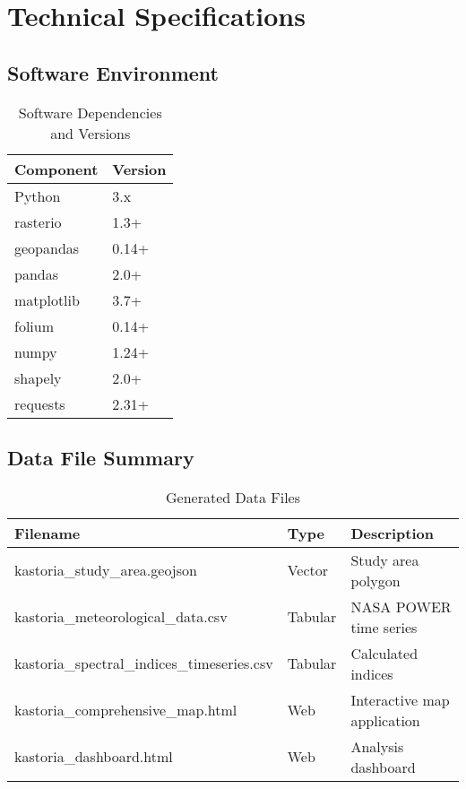 \documentclass[a4paper,12pt]{article}
\begin{document}
\newpage
\appendix

\section{Technical Specifications}

\subsection{Software Environment}

\begin{table}[H]
    \centering
    \caption{Software Dependencies and Versions}
    \begin{tabular}{@{}ll@{}}
        \toprule
        Component  & Version \\
        \midrule
        Python     & 3.x     \\
        rasterio   & 1.3+    \\
        geopandas  & 0.14+   \\
        pandas     & 2.0+    \\
        matplotlib & 3.7+    \\
        folium     & 0.14+   \\
        numpy      & 1.24+   \\
        shapely    & 2.0+    \\
        requests   & 2.31+   \\
        \bottomrule
    \end{tabular}
\end{table}

\subsection{Data File Summary}

\begin{table}[H]
    \centering
    \caption{Generated Data Files}
    \begin{tabular}{@{}lll@{}}
        \toprule
        Filename                                    & Type    & Description                 \\
        \midrule
        kastoria\_study\_area.geojson               & Vector  & Study area polygon          \\
        kastoria\_meteorological\_data.csv          & Tabular & NASA POWER time series      \\
        kastoria\_spectral\_indices\_timeseries.csv & Tabular & Calculated indices          \\
        kastoria\_comprehensive\_map.html           & Web     & Interactive map application \\
        kastoria\_dashboard.html                    & Web     & Analysis dashboard          \\
        \bottomrule
    \end{tabular}
\end{table}
\end{document}
